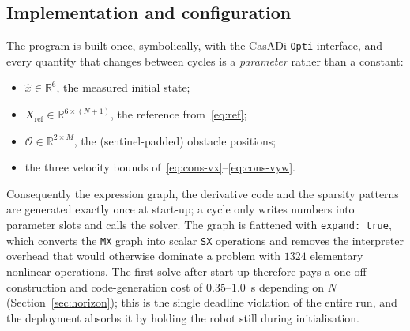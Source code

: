 \documentclass[11pt,a4paper]{article}
\newcommand{\R}{\mathbb{R}}
\begin{document}
\subsection{Implementation and configuration}
\label{sec:impl}

The program is built once, symbolically, with the CasADi \texttt{Opti} interface, and every quantity that
changes between cycles is a \emph{parameter} rather than a constant:
\begin{itemize}\itemsep2pt
  \item $\hat x\in\R^{6}$, the measured initial state;
  \item $X_{\mathrm{ref}}\in\R^{6\times(N+1)}$, the reference from~\eqref{eq:ref};
  \item $\mathcal{O}\in\R^{2\times M}$, the (sentinel-padded) obstacle positions;
  \item the three velocity bounds of~\eqref{eq:cons-vx}--\eqref{eq:cons-vyw}.
\end{itemize}
Consequently the expression graph, the derivative code and the sparsity patterns are generated exactly once at
start-up; a cycle only writes numbers into parameter slots and calls the solver. The graph is flattened with
\texttt{expand:\,true}, which converts the \texttt{MX} graph into scalar \texttt{SX} operations and removes
the interpreter overhead that would otherwise dominate a problem with $1324$ elementary nonlinear
operations. The first solve after start-up therefore pays a one-off construction and code-generation cost of
$0.35$--$1.0$~s depending on $N$ (Section~\ref{sec:horizon}); this is the single deadline violation of the
entire run, and the deployment absorbs it by holding the robot still during initialisation.
\end{document}
